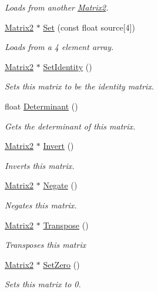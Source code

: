 \begin{DoxyCompactItemize}
\begin{DoxyCompactList}\small\item\em Loads from another \hyperlink{class_flounder_1_1_matrix2}{Matrix2}. \end{DoxyCompactList}\item 
\hyperlink{class_flounder_1_1_matrix2}{Matrix2} $\ast$ \hyperlink{class_flounder_1_1_matrix2_ab7eb0b3da02f9522314d39927091c05a}{Set} (const float source\mbox{[}4\mbox{]})
\begin{DoxyCompactList}\small\item\em Loads from a 4 element array. \end{DoxyCompactList}\item 
\hyperlink{class_flounder_1_1_matrix2}{Matrix2} $\ast$ \hyperlink{class_flounder_1_1_matrix2_a394f10b0955184bf77cbf42561679ddb}{Set\+Identity} ()
\begin{DoxyCompactList}\small\item\em Sets this matrix to be the identity matrix. \end{DoxyCompactList}\item 
float \hyperlink{class_flounder_1_1_matrix2_a99984cf5d73893ee9e5e5f52b53f7e77}{Determinant} ()
\begin{DoxyCompactList}\small\item\em Gets the determinant of this matrix. \end{DoxyCompactList}\item 
\hyperlink{class_flounder_1_1_matrix2}{Matrix2} $\ast$ \hyperlink{class_flounder_1_1_matrix2_a246d883584ea3193e2db6018a39046cc}{Invert} ()
\begin{DoxyCompactList}\small\item\em Inverts this matrix. \end{DoxyCompactList}\item 
\hyperlink{class_flounder_1_1_matrix2}{Matrix2} $\ast$ \hyperlink{class_flounder_1_1_matrix2_ac20924a7be1bee4a40f22044041c22b3}{Negate} ()
\begin{DoxyCompactList}\small\item\em Negates this matrix. \end{DoxyCompactList}\item 
\hyperlink{class_flounder_1_1_matrix2}{Matrix2} $\ast$ \hyperlink{class_flounder_1_1_matrix2_a3167f5dd9e522e9c7aaf9a0cdce42794}{Transpose} ()
\begin{DoxyCompactList}\small\item\em Transposes this matrix \end{DoxyCompactList}\item 
\hyperlink{class_flounder_1_1_matrix2}{Matrix2} $\ast$ \hyperlink{class_flounder_1_1_matrix2_a9eb1eb1c5cd7d7830f9be4e273deafeb}{Set\+Zero} ()
\begin{DoxyCompactList}\small\item\em Sets this matrix to 0. \end{DoxyCompactList}\end{DoxyCompactItemize}
